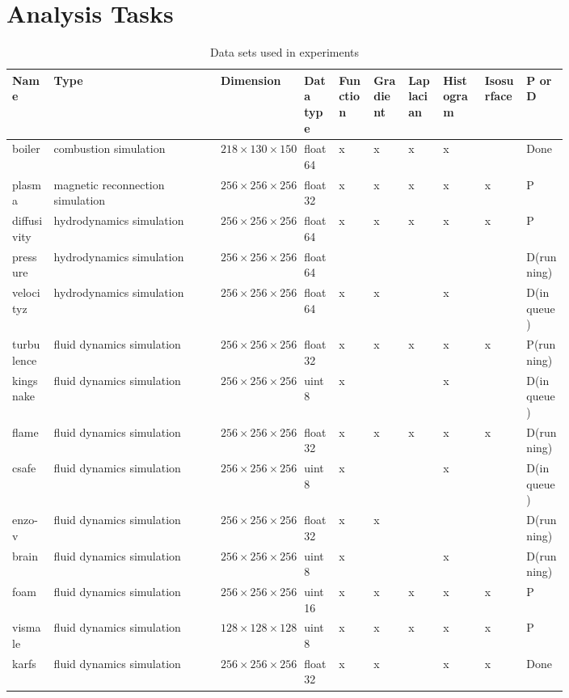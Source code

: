 \section{ Analysis Tasks}\label{sec:analysis-tasks}

\begin{table*}[t]
  \caption{Data sets used in experiments }
  \centering
  \begin{tabular}{p{0.06\linewidth}p{0.24\linewidth}p{0.12\linewidth}p{0.05\linewidth}p{0.05\linewidth}p{0.05\linewidth}p{0.05\linewidth}p{0.06\linewidth}p{0.06\linewidth}p{0.06\linewidth}}
  \hline
  Name & Type & Dimension & Data type & Function & Gradient & Laplacian & Histogram & Isosurface & P or D\\
  \hline
  boiler & combustion simulation& $218\times 130 \times 150$ & float64 & x & x & x & x &  & Done \\
  plasma & magnetic reconnection simulation& $256\times 256 \times 256$ & float32 & x & x & x & x & x & P\\
  diffusivity & hydrodynamics simulation& $256\times 256\times 256$ & float64 & x & x & x & x & x & P\\
  pressure & hydrodynamics simulation& $256\times 256 \times 256$ & float64 &  &  &  &  &  & D(running)\\
  velocityz & hydrodynamics simulation& $256\times 256\times 256$ & float64 & x & x &  & x &  & D(in queue)\\
	turbulence & fluid dynamics simulation& $256\times 256 \times 256$ & float32 & x & x & x & x & x &
	P(running)\\
	kingsnake & fluid dynamics simulation& $256\times 256 \times 256$ & uint8 & x &  &  & x &  & D(in queue)\\
	flame & fluid dynamics simulation& $256\times 256 \times 256$ & float32 & x & x & x & x & x & D(running)\\
	csafe & fluid dynamics simulation& $256\times 256 \times 256$ & uint8 & x &  &  & x &  & D(in queue)\\
	enzo-v & fluid dynamics simulation& $256\times 256 \times 256$ & float32 & x & x &  &  &  & D(running)\\
	brain & fluid dynamics simulation& $256\times 256 \times 256$ & uint8 & x &  &  & x &  & D(running)\\
	foam & fluid dynamics simulation& $256\times 256 \times 256$ & uint16 & x & x & x & x & x & P\\
	vismale & fluid dynamics simulation& $128\times 128 \times 128$ & uint8 & x & x & x & x & x & P\\
	karfs	& fluid dynamics simulation& $256\times 256 \times 256$ & float32 & x & x &  & x & x & Done\\
  \hline
  \end{tabular}\label{tbl:data-sets}
\end{table*}

